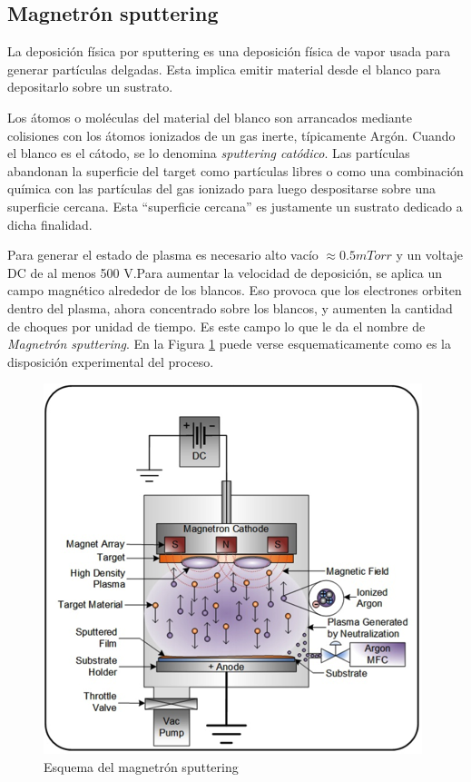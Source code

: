 \documentclass{article}
\theoremstyle{definition}
\theoremstyle{remark}
\begin{document}
\subsection{Magnetrón sputtering}
La deposición física por sputtering es una deposición física de vapor usada para generar partículas delgadas. Esta implica emitir material desde el blanco para depositarlo sobre un sustrato. 

 Los átomos o moléculas del material del blanco son arrancados mediante colisiones con los átomos ionizados de un gas inerte, típicamente Argón. Cuando el blanco es el cátodo, se lo denomina \textit{sputtering catódico}. Las partículas abandonan la superficie del target como partículas libres o como una combinación química con las partículas del gas ionizado para luego despositarse sobre una superficie cercana.  Esta ``superficie cercana'' es justamente un sustrato dedicado a dicha finalidad.
 
Para generar el estado de plasma es necesario alto vacío $\approx 0.5 mTorr$ y un voltaje DC de al menos 500 V.Para aumentar la velocidad de deposición, se aplica un campo magnético alrededor de los blancos. Eso provoca que los electrones orbiten dentro del plasma, ahora concentrado sobre los blancos, y aumenten la cantidad de choques por unidad de tiempo. Es este campo lo que le da el nombre de \textit{Magnetrón sputtering}\citep{Malvasio}\citep{ThinFilm}. En la Figura \ref{sputter} puede verse esquematicamente como es la disposición experimental del proceso.

\begin{figure}[H]
	\centering
	\includegraphics[scale=0.8]{img/diagram-dc-magnatron.png}
	\caption{Esquema del magnetrón sputtering}
	\label{sputter}
\end{figure}
\end{document}
